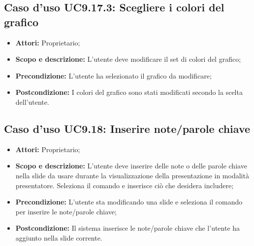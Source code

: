 		\subsection{Caso d'uso UC9.17.3: Scegliere i colori del grafico}
		\begin{itemize}
			\item \textbf{Attori:} Proprietario;
			\item \textbf{Scopo e descrizione:} L'utente deve modificare il set di colori del grafico;
			\item \textbf{Precondizione:} L'utente ha selezionato il grafico da modificare;
			\item \textbf{Postcondizione:} I colori del grafico sono stati modificati secondo la scelta dell'utente.
		\end{itemize}


\subsection{Caso d'uso UC9.18: Inserire note/parole chiave}
\begin{itemize}
	\item \textbf{Attori:} Proprietario;
	\item \textbf{Scopo e descrizione:} L'utente deve inserire delle note o delle parole chiave nella \gls{slide} da usare durante la visualizzazione della presentazione in modalità presentatore. Seleziona il comando e inserisce ciò che desidera includere;
	\item \textbf{Precondizione:} L'utente sta modificando una \gls{slide} e seleziona il comando per inserire le note/parole chiave;
	\item \textbf{Postcondizione:} Il sistema inserisce le note/parole chiave che l'utente ha aggiunto nella \gls{slide} corrente.
\end{itemize}

